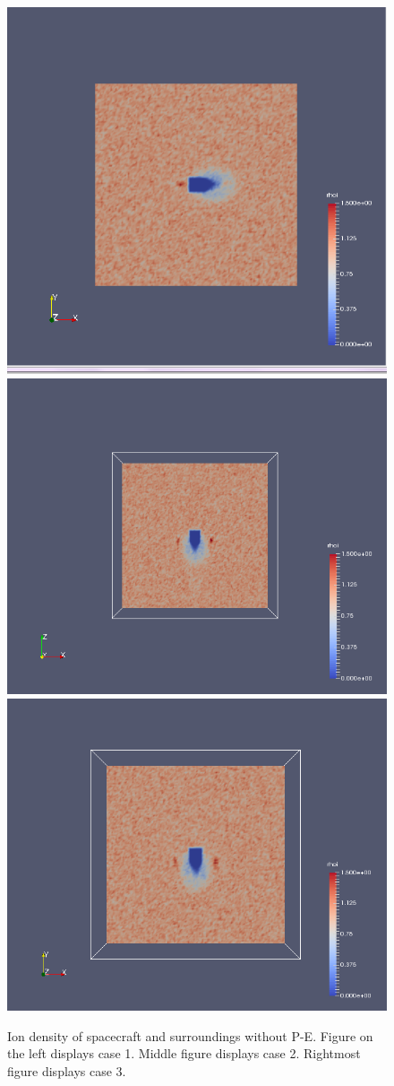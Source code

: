     \begin{figure}
        \includegraphics[width = 0.3 \textwidth]{images/ion density case1.png}
        \includegraphics[width = 0.3 \textwidth]{images/ion density x-z case2.png}
	 \includegraphics[width = 0.3 \textwidth]{images/ion density x-y case3.png}
        \caption{Ion density of spacecraft and surroundings without P-E. Figure on the left displays case 1. Middle figure displays case 2. Rightmost figure displays case 3.}
    \end{figure}
